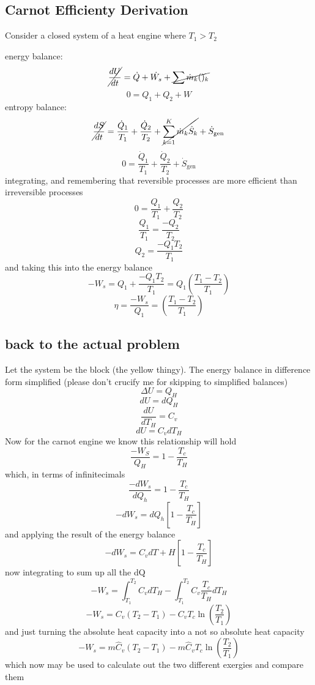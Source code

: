 \documentclass{article}
\begin{document}
\subsection*{Carnot Efficienty Derivation}
Consider a closed system of a heat engine where $T_1 > T_2$
\begin{center}
\end{center}
energy balance:
\[ \cancel{\frac{dU}{dt}} = \dot{Q} + \dot{W_s} + \cancel{\sum \dot{m}_k()_k} \]
\[ 0 = Q_1 + Q_2 + W\]
entropy balance:
\[ \cancel{\frac{dS}{dt}} = \frac{\dot{Q}_1}{T_1} + \frac{\dot{Q}_2}{T_2} + \cancel{\sum_{k=1}^{K}\dot{m}_k \hat{S}_k} + \dot{S}_{\text{gen}} \]
\[ 0 = \frac{\dot{Q}_1}{T_1} + \frac{\dot{Q}_2}{T_2}  + \dot{S}_{\text{gen}} \]
integrating, and remembering that reversible processes are more efficient than irreversible processes
\[ 0 = \frac{Q_1}{T_1} + \frac{Q_2}{T_2} \]
\[ \frac{Q_1}{T_1} = \frac{- Q_2}{T_2} \]
\[ Q_2 = \frac{- Q_1 T_2}{T_1} \]
and taking this into the energy balance
\[ -W_s= Q_1 + \frac{- Q_1 T_2}{T_1} = Q_1 \left(\frac{T_1 - T_2}{T_1}\right) \]
\[ \eta = \frac{-W_s}{Q_1} = \left(\frac{T_1 - T_2}{T_1}\right) \]
\subsection*{back to the actual problem}

\noindent
Let the system be the block (the yellow thingy). The energy balance in difference form simplified (please don't crucify me for skipping to simplified balances)
\[ \Delta U = Q_H \]
\[ dU = dQ_H \]
\[ \frac{dU}{dT_H} = C_v \]
\[ dU = C_v dT_H \]
Now for the carnot engine we know this relationship will hold
\[ \frac{-W_S}{Q_H} = 1 - \frac{T_c}{T_H} \]
which, in terms of infinitecimals
\[ \frac{-dW_s}{dQ_h} = 1 - \frac{T_c}{T_H} \]
\[ -dW_s = dQ_h \left[1 - \frac{T_c}{T_H}\right] \]
and applying the result of the energy balance
\[ -dW_s = C_v dT+H \left[1 - \frac{T_c}{T_H}\right] \]
now integrating to sum up all the dQ
\[ -W_s = \int_{T_1}^{T_2} C_v dT_H - \int_{T_1}^{T_2}C_v \frac{T_c}{T_H} dT_H \]
\[ -W_s = C_v \left(T_2 - T_1\right) - C_v T_c \ln \left(\frac{T_2}{T_1}\right) \]
and just turning the absolute heat capacity into a not so absolute heat capacity
\[ -W_s = m\hat{C}_v \left(T_2 - T_1\right) - m\hat{C}_v T_c \ln \left(\frac{T_2}{T_1}\right) \]
which now may be used to calculate out the two different exergies and compare them
\end{document}
